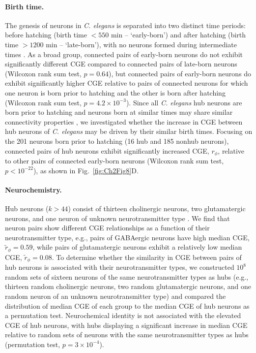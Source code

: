 {\paragraph{Birth time.}
The genesis of neurons in \emph{C. elegans} is separated into two distinct time periods: before hatching (birth time $<550$ min -- `early-born') and after hatching (birth time $>1200$ min -- `late-born'), with no neurons formed during intermediate times \citep{Varier2011}.
As a broad group, connected pairs of early-born neurons do not exhibit significantly different CGE compared to connected pairs of late-born neurons (Wilcoxon rank sum test, $p = 0.64$), but connected pairs of early-born neurons do exhibit significantly higher CGE relative to pairs of connected neurons for which one neuron is born prior to hatching and the other is born after hatching (Wilcoxon rank sum test, $p = 4.2 \times 10^{-3}$).
Since all \emph{C. elegans} hub neurons are born prior to hatching \citep{Towlson2013} and neurons born at similar times may share similar connectivity properties \citep{Varier2011, Towlson2013}, we investigated whether the increase in CGE between hub neurons of \emph{C. elegans} may be driven by their similar birth times.
Focusing on the 201 neurons born prior to hatching (16 hub and 185 nonhub neurons), connected pairs of hub neurons exhibit significantly increased CGE, $r_\phi$, relative to other pairs of connected early-born neurons (Wilcoxon rank sum test, $p < 10^{-22}$), as shown in Fig.~\ref{fig:Ch2Fig8}D.

\paragraph{Neurochemistry.}
Hub neurons ($k > 44$) consist of thirteen cholinergic neurons, two glutamatergic neurons, and one neuron of unknown neurotransmitter type \citep{Pereira2015}.
We find that neuron pairs show different CGE relationships as a function of their neurotransmitter type, e.g., pairs of GABAergic neurons have high median CGE, $\tilde{r}_\phi = 0.59$, while pairs of glutamatergic neurons exhibit a relatively low median CGE, $\tilde{r}_\phi = 0.08$.
To determine whether the similarity in CGE between pairs of hub neurons is associated with their neurotransmitter types, we constructed $10^8$ random sets of sixteen neurons of the same neurotransmitter types as hubs (e.g., thirteen random cholinergic neurons, two random glutamatergic neurons, and one random neuron of an unknown neurotransmitter type) and compared the distribution of median CGE of each group to the median CGE of hub neurons as a permutation test.
Neurochemical identity is not associated with the elevated CGE of hub neurons, with hubs displaying a significant increase in median CGE relative to random sets of neurons with the same neurotransmitter types as hubs (permutation test, $p = 3\times10^{-4}$).

}
